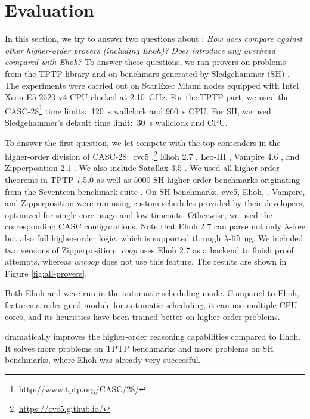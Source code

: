 \section{Evaluation}
\label{sec:eval}

In this section, we try to answer two questions about \ehohii{}: \emph{How does
\ehohii{} compare against other higher-order provers (including Ehoh)?} \emph{Does
\ehohii{} introduce any overhead compared with Ehoh?} To answer
these questions, we ran provers on problems from the TPTP library \cite{gs-17-tptp} and on
benchmars generated by Sledgehammer (SH) \cite{pb-12-sh}.
The experiments were carried out on StarExec Miami
\cite{sst-14-starexec} nodes equipped with Intel Xeon E5-2620 v4 CPU clocked at
2.10~GHz. For the TPTP part, we used the CASC-28\footnote{\url{http://www.tptp.org/CASC/28/}} time limits:\ 120~s
wallclock and 960~s CPU. For SH, we used Sledgehammer's
default time limit:\ 30~s wallclock and CPU.

To answer the first question, we let
\ehohii{} compete with the top contenders in the higher-order division of
CASC-28:\ cvc5
,\footnote{\url{https://cvc5.github.io/}}
Ehoh 2.7
\cite{section-ehoh}, Leo-III  \cite{sb-21-leo3}, Vampire 4.6
\cite{br-20-full-sup-w-combs}, and Zipperposition 2.1
\cite{section-making-ho-work}. We also include Satallax 3.5
\cite{cb-12-satallax}. We used all  higher-order
theorems in TPTP 7.5.0 as well as 5000 SH higher-order benchmarks
originating from the Seventeen benchmark suite \cite{desharnais-et-al-202x}.
On SH benchmarks,
cvc5, Ehoh, \ehohii{}, Vampire, and Zipperposition were run using custom schedules provided by
their developers, optimized for single-core usage and low timeouts.
Otherwise, we used the corresponding CASC configurations.
Note that Ehoh 2.7 can parse not only $\lambda$-free but also full higher-order logic,
which is supported through $\lambda$-lifting.
We included two versions of Zipperposition:\ \emph{coop} uses Ehoh 2.7 as a backend to finish proof attempts,
whereas \emph{uncoop} does not use this feature. The results
are shown in Figure \ref{fig:all-provers}.

Both Ehoh and \ehohii{} were run in the automatic scheduling mode. Compared to Ehoh,
\ehohii{} features a redesigned module for automatic scheduling, it
can use multiple CPU cores, and its heuristics have been trained better on higher-order problems.

\ehohii{} dramatically improves the higher-order reasoning capabilities
compared to Ehoh. It solves  more problems on TPTP benchmarks
and  more problems on SH benchmarks, where Ehoh was already very
successful.

